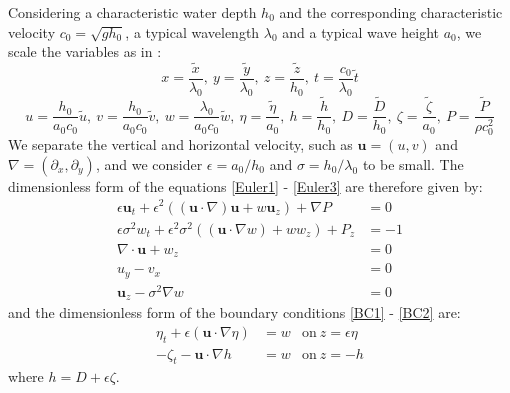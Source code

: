 \documentclass[11pt,a4paper]{article}
\begin{document}
	Considering a characteristic water depth $h_0$ and the corresponding 	characteristic velocity $c_0 = \sqrt{g h_0}$, a typical wavelength $\lambda_0$ and a typical wave height $a_0$, we scale the variables as in \cite{DM2013}: 
	\begin{equation*}
		x = \frac{\tilde{x}}{\lambda_0},\: 
		y = \frac{\tilde{y}}{\lambda_0}, \:
		z = \frac{\tilde{z}}{h_0}, \: 
		t = \frac{c_0}{\lambda_0}\tilde{t}
	\end{equation*}
	\begin{equation*}
		u = \frac{h_0}{a_0 c_0} \tilde{u},\:
		v = \dfrac{h_0}{a_0 c_0} \tilde{v},\:
		w = \dfrac{\lambda_0}{a_0 c_0} \tilde{w},\: 
		\eta = \dfrac{\tilde{\eta}}{a_0},\: 
		h = \dfrac{\tilde{h}}{h_0},\:
		D = \dfrac{\tilde{D}}{h_0}, \:
		\zeta = \dfrac{\tilde{\zeta}}{a_0},\:
		P = \dfrac{\tilde{P}}{\rho c_0^2}				
	\end{equation*}
	We separate the vertical and horizontal velocity, such as $\mathbf{u} = (u,v)$ and $\nabla = (\partial_x,\partial_y)$, and we consider $\epsilon = a_0 / h_0$ and $\sigma = h_0 / \lambda_0$ to be small. The dimensionless form of the equations \eqref{Euler1} - \eqref{Euler3} are therefore given by: 
	\begin{align}
		\epsilon \mathbf{u}_t + \epsilon^2((\mathbf{u} \cdot \nabla) \mathbf{u} + w \mathbf{u}_z) + \nabla P & = 0 \label{MConsxy}\\
		\epsilon \sigma^2 w_t + \epsilon^2 \sigma^2 ((\mathbf{u} \cdot \nabla w) + w w_z) + P_z & = -1 \label{MConsz}\\
		\nabla \cdot \mathbf{u} + w_z & =  0 \label{MassCons}\\
		u_y-v_x & = 0 \label{Irrxy}\\
		\mathbf{u}_z - \sigma^2 \nabla w & = 0 \label{Irrz}
	\end{align}
	and the dimensionless form of the boundary conditions \eqref{BC1} - \eqref{BC2} are: 
	\begin{align}
		\eta_t + \epsilon (\mathbf{u} \cdot \nabla \eta ) & = w & \mathrm{on} \: z =\epsilon \eta \label{BCH}\\
		- \zeta_t - \mathbf{u} \cdot \nabla h & = w & \mathrm{on} \:  z = -h
		\label{BCB}
	\end{align}
	where $h = D + \epsilon \zeta $.
			
\end{document}
